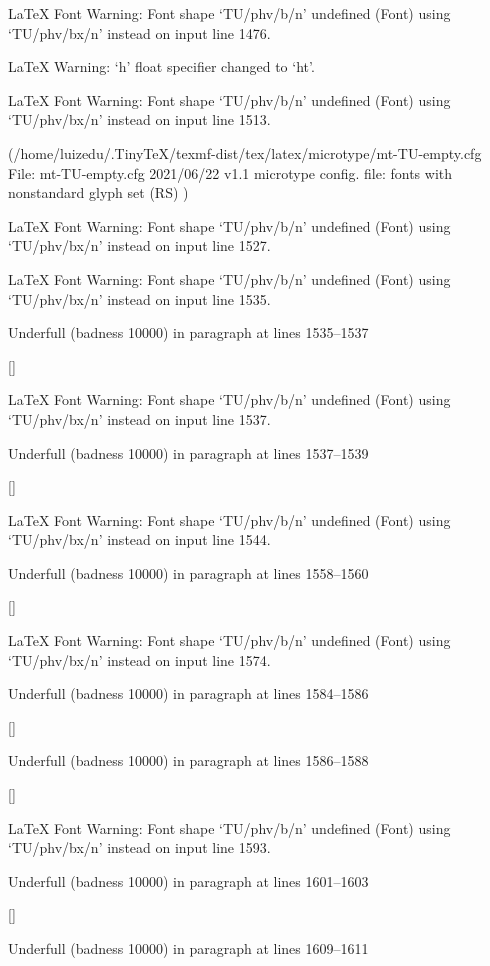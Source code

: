 LaTeX Font Warning: Font shape `TU/phv/b/n' undefined
(Font)              using `TU/phv/bx/n' instead on input line 1476.


LaTeX Warning: `h' float specifier changed to `ht'.


LaTeX Font Warning: Font shape `TU/phv/b/n' undefined
(Font)              using `TU/phv/bx/n' instead on input line 1513.

(/home/luizedu/.TinyTeX/texmf-dist/tex/latex/microtype/mt-TU-empty.cfg
File: mt-TU-empty.cfg 2021/06/22 v1.1 microtype config. file: fonts with nonstandard glyph set (RS)
)

LaTeX Font Warning: Font shape `TU/phv/b/n' undefined
(Font)              using `TU/phv/bx/n' instead on input line 1527.


LaTeX Font Warning: Font shape `TU/phv/b/n' undefined
(Font)              using `TU/phv/bx/n' instead on input line 1535.


Underfull \hbox (badness 10000) in paragraph at lines 1535--1537

 []


LaTeX Font Warning: Font shape `TU/phv/b/n' undefined
(Font)              using `TU/phv/bx/n' instead on input line 1537.


Underfull \hbox (badness 10000) in paragraph at lines 1537--1539

 []


LaTeX Font Warning: Font shape `TU/phv/b/n' undefined
(Font)              using `TU/phv/bx/n' instead on input line 1544.


Underfull \hbox (badness 10000) in paragraph at lines 1558--1560

 []


LaTeX Font Warning: Font shape `TU/phv/b/n' undefined
(Font)              using `TU/phv/bx/n' instead on input line 1574.


Underfull \hbox (badness 10000) in paragraph at lines 1584--1586

 []


Underfull \hbox (badness 10000) in paragraph at lines 1586--1588

 []


LaTeX Font Warning: Font shape `TU/phv/b/n' undefined
(Font)              using `TU/phv/bx/n' instead on input line 1593.


Underfull \hbox (badness 10000) in paragraph at lines 1601--1603

 []


Underfull \hbox (badness 10000) in paragraph at lines 1609--1611

